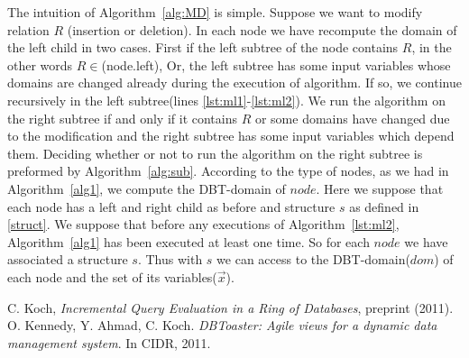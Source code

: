 \documentclass[12pt]{article}
\begin{document}
The intuition of Algorithm~\ref{alg:MD} is simple. Suppose we want to modify relation $R$ (insertion or deletion). In each node we have recompute the domain of the left child in two cases. First if the left subtree of the node contains $R$, in the other words $R\in$\Rel(node.left), Or, the left subtree has some input variables whose domains are changed already during the execution of algorithm. If so, we continue recursively in the left subtree(lines \ref{lst:ml1}-\ref{lst:ml2}). We run the algorithm on the right subtree if and only if it contains $R$ or some domains have changed due to the modification and the right subtree has some input variables which depend them. Deciding whether or not to run the algorithm on the right subtree is preformed by Algorithm~\ref{alg:sub}.
According to the type of nodes, as we had in Algorithm~\ref{alg1}, we compute the DBT-domain of $node$. Here we suppose that each node has a left and right child as before and structure $s$ as defined in \ref{struct}. We suppose that before any executions of Algorithm~\ref{lst:ml2}, Algorithm~\ref{alg1} has been executed at least one time. So for each $node$ we have associated a structure $s$. Thus with $s$ we can access to the DBT-domain($dom$) of each node and the set of its variables($\vec{x}$). 

\begin{thebibliography}{9}
 C. Koch, \emph{Incremental Query Evaluation in a Ring of Databases},  preprint (2011).
 O. Kennedy, Y. Ahmad, C. Koch. \emph{DBToaster: Agile views for a dynamic data management system}. In CIDR, 2011.
\end{thebibliography}
\end{document}
